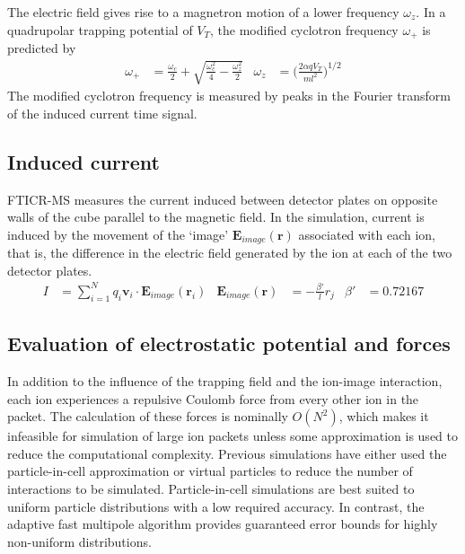 \documentclass[10pt,conference,onecolumn]{IEEEtran}
\begin{document}
The electric field gives rise to a magnetron motion of a lower frequency $\omega_z$.
In a quadrupolar trapping potential of $V_T$, the modified cyclotron frequency $\omega_+$ is predicted by
\begin{align}
\omega_+ &= \frac{\omega_c}{2} + \sqrt{\frac{\omega_c^2}{4} - \frac{\omega_z^2}{2}} &
\omega_z &= \biggl(\frac{2 \alpha q V_T}{m l^2}\biggr)^{1/2}
\end{align}
The modified cyclotron frequency is measured by peaks in the Fourier transform of the induced current time signal.

\subsection{Induced current}

FTICR-MS measures the current induced between detector plates on opposite walls of the cube parallel to the magnetic field.
In the simulation, current is induced by the movement of the `image' $\mathbf{E}_{image}(\mathbf{r})$ associated with each ion, that is, the difference in the electric field generated by the ion at each of the two detector plates\cite{Guan1995}.
\begin{align}
I &= \sum_{i=1}^N q_i\mathbf{v}_i \cdot \mathbf{E}_{image}(\mathbf{r}_i) & \mathbf{E}_{image}(\mathbf{r}) &= - \frac{\beta'}{l} r_j & \beta' &= 0.72167
\end{align}

\subsection{Evaluation of electrostatic potential and forces}

In addition to the influence of the trapping field and the ion-image interaction, each ion experiences a repulsive Coulomb force from every other ion in the packet.
The calculation of these forces is nominally $O(N^2)$, which makes it infeasible for simulation of large ion packets unless some approximation is used to reduce the computational complexity.
Previous simulations have either used the particle-in-cell approximation\cite{Leach2009} or virtual particles to reduce the number of interactions to be simulated\cite{Fujiwara2010}.
Particle-in-cell simulations are best suited to uniform particle distributions with a low required accuracy\cite{Greengard1989}.
In contrast, the adaptive fast multipole algorithm\cite{Cheng1999} provides guaranteed error bounds for highly non-uniform distributions.
\end{document}
